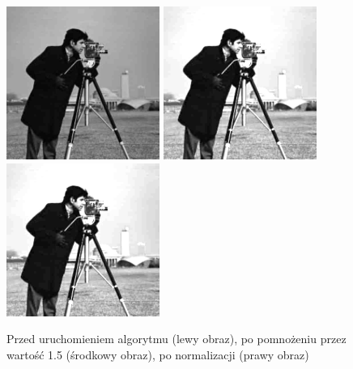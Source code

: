 \documentclass[a4paper,12pt]{book}
\begin{document}
\begin{figure}[H]
	\caption{Przed uruchomieniem algorytmu (lewy obraz), po pomnożeniu przez wartość 1.5 (środkowy obraz), po normalizacji (prawy obraz)}
	\includegraphics[width=5cm, height=5cm]{man-unmodified.jpg}
	\includegraphics[width=5cm, height=5cm]{2/multiply-gray-const-2.png}
	\includegraphics[width=5cm, height=5cm]{2/multiply-gray-const-2-norm.png}
\end{figure}
\end{document}
